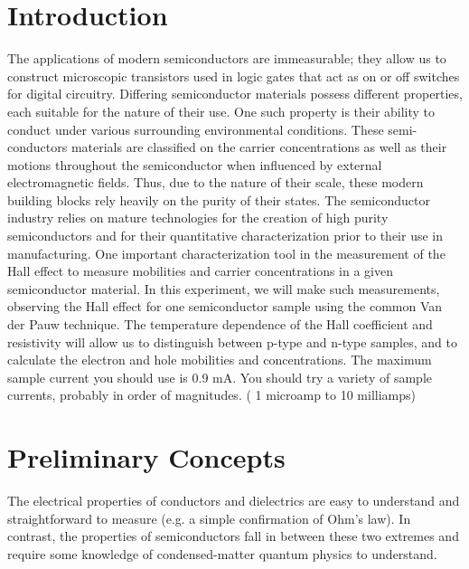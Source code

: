 \documentclass{../lab}
\begin{document}

\section{Introduction}

The applications of modern semiconductors are immeasurable; they allow us to construct microscopic transistors used in logic gates that act as on or off switches for digital circuitry. Differing semiconductor materials possess different properties, each suitable for the nature of their use. One such property is their ability to conduct under various surrounding environmental conditions. These semi-conductors materials are classified on the carrier concentrations as well as their motions throughout the semiconductor when influenced by external electromagnetic fields. Thus, due to the nature of their scale, these modern building blocks rely heavily on the purity of their states. The semiconductor industry relies on mature technologies for the creation of high purity semiconductors and for their quantitative characterization prior to their use in manufacturing. One important characterization tool in the measurement of the Hall effect to measure mobilities and carrier concentrations in a given semiconductor material. In this experiment, we will make such measurements, observing the Hall effect for one semiconductor sample using the common Van der Pauw technique. The temperature dependence of the Hall coefficient and resistivity will allow us to distinguish between p-type and n-type samples, and to calculate the electron and hole mobilities and concentrations. The maximum sample current you should use is 0.9 mA. You should try a variety of sample currents, probably in order of magnitudes. ( 1 microamp to 10 milliamps)

\section{Preliminary Concepts}

The electrical properties of conductors and dielectrics are easy to understand and straightforward to measure (e.g. a simple confirmation of Ohm's law). In contrast, the properties of semiconductors fall in between these two extremes and require some knowledge of condensed-matter quantum physics to understand.
\end{document}
